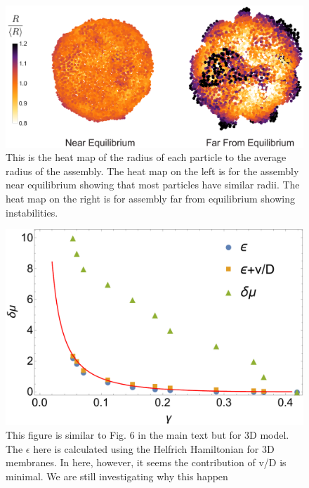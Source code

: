 \documentclass[amsmath,preprintnumbers,10pt,nofootinbib,prl,twocolumn]{revtex4-1}
\begin{document}
\begin{figure}
\includegraphics[width=1\linewidth,angle=0]{Fig11.pdf}
\caption{ This is the heat map of the radius of each particle to the average radius of the assembly. The heat map on the left is for the assembly near equilibrium showing that most particles have similar radii. The heat map on the right is for assembly far from equilibrium showing instabilities.  }
\label{fig:relativeradius3D}
\end{figure}
\begin{figure}
\includegraphics[width=1\linewidth,angle=0]{Fig12.pdf}
\caption{ This figure is similar to Fig. 6 in the main text but for 3D model. The $\epsilon$ here is calculated using the Helfrich Hamiltonian for 3D membranes. In here, however, it seems the contribution of v/D is minimal. We are still investigating why this happen }
\label{fig:boundsof3Dmembrane}
\end{figure}

\end{document}
